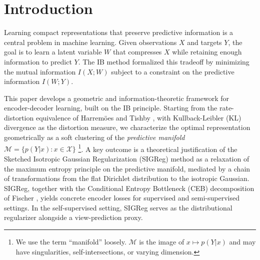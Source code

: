 \documentclass[11pt]{article}
\begin{document}
\begin{abstract}

\end{abstract}


\section{Introduction}

Learning compact representations that preserve predictive information
is a central problem in machine learning.
Given observations $X$ and targets $Y$, the goal is to learn a latent
variable $W$ that compresses $X$ while retaining enough information to
predict $Y$.
The IB method \cite{tishby1999information}
formalized this tradeoff by minimizing the mutual information $I(X;W)$
subject to a constraint on the predictive information $I(W;Y)$.

This paper develops a geometric and information-theoretic
framework for encoder-decoder learning, built on the IB
principle.
Starting from the rate-distortion equivalence of Harrem\"oes and
Tishby \cite{harremoes2007information}, with Kullback-Leibler (KL) divergence as the
distortion measure, we characterize the optimal representation
geometrically as a soft clustering of the \textit{predictive manifold}
$\mathcal{M}=\{p(Y|x):x\in\mathcal{X}\}$%
\footnote{We use the term ``manifold'' loosely. $\mathcal{M}$ is the
image of $x\mapsto p(Y|x)$ and may have singularities,
self-intersections, or varying dimension.}.
A key outcome is a theoretical justification of the Sketched Isotropic Gaussian Regularization (SIGReg) method
\cite{balestriero2025lejepa} as a relaxation of the maximum entropy
principle on the predictive manifold, mediated by a chain of
transformations from the flat Dirichlet distribution to the isotropic
Gaussian.
SIGReg, together with the Conditional Entropy Bottleneck (CEB) decomposition of Fischer
\cite{fischer2020conditional}, yields concrete encoder losses for
supervised and semi-supervised settings. In the self-supervised
setting, SIGReg serves as the distributional regularizer alongside a
view-prediction proxy.
\end{document}
